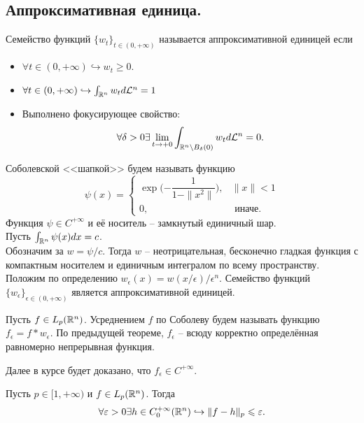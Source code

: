\subsection{Аппроксимативная единица.}
\begin{definition}
    Семейство функций $\{w_t\}_{t \in (0, +\infty)}$ называется аппроксимативной единицей если
    \begin{itemize}
        \item $\forall t \in (0, +\infty) \hookrightarrow w_t \geq 0$.
        \item $\forall t \in (0, +\infty) \hookrightarrow \int_{\mathbb{R}^n} w_t d\mathcal{L}^n = 1$
        \item Выполнено фокусирующее свойство: \[\forall \delta > 0  \exists \lim\limits_{t \rightarrow +0} \int_{\mathbb{R}^n \setminus B_\delta(0)} w_{t}d\mathcal{L}^n = 0.\]
    \end{itemize}
\end{definition}
\begin{example}
    Соболевской <<шапкой>> будем называть функцию
    \[
        \psi(x) = \begin{cases}
                      \exp\biggr({-\dfrac{1}{1 - \|x^2\|}}\biggr), & \|x\| < 1 \\
                      0, & \text{ иначе.}
        \end{cases}
    \]
    Функция $\psi \in C^{+\infty}$ и её носитель -- замкнутый единичный шар. \\
    Пусть $\int_{\mathbb{R}^n} \psi(x)dx = c$. \\
    Обозначим за $w = \psi/c$.
    Тогда $w$ -- неотрицательная, бесконечно гладкая функция с компактным носителем и единичным интегралом по всему пространству. \\
    Положим по определению $w_\epsilon(x) = w(x/\epsilon)/\epsilon^n$.
    Семейство функций $\{w_\epsilon\}_{\epsilon \in (0, +\infty)}$ является аппроксимативной единицей.
\end{example}
\begin{corollary}
    Пусть $f \in L_p(\mathbb{R}^n)$.
    Усреднением $f$ по Соболеву будем называть функцию $f_\epsilon = f * w_\epsilon$.
    По предыдущей теореме, $f_\epsilon$ -- всюду корректно определённая равномерно непрерывная функция.
\end{corollary}
\begin{note}
    Далее в курсе будет доказано, что $f_\epsilon \in C^{+\infty}$.
\end{note}
\begin{theorem}
    Пусть $p \in [1, +\infty)$ и $f \in L_p(\mathbb{R}^n)$. Тогда
    \[
        \forall \varepsilon > 0 \exists h \in C^{+\infty}_0(\mathbb{R}^n) \hookrightarrow \|f - h\|_p \leqslant \varepsilon.
    \]
\end{theorem}
